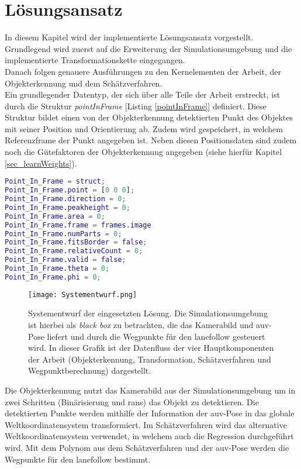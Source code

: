 \cleardoublepage
\section{Lösungsansatz}
In diesem Kapitel wird der implementierte Lösungsansatz vorgestellt. Grundlegend wird zuerst auf die Erweiterung der Simulationsumgebung und die implementierte Transformationskette eingegangen.\\
Danach folgen genauere Ausführungen zu den Kernelementen der Arbeit, der Objekterkennung und dem Schätzverfahren.\\

Ein grundlegender Datentyp, der sich über alle Teile der Arbeit erstreckt, ist durch die Struktur \textit{pointInFrame} [Listing \ref{pointInFrame}] definiert. Diese Struktur bildet einen von der Objekterkennung detektierten Punkt des Objektes mit seiner Position und Orientierung ab. Zudem wird gespeichert, in welchem Referenzframe der Punkt angegeben ist. Neben diesen Positionsdaten sind zudem noch die Gütefaktoren der Objekterkennung angegeben (siehe hierfür Kapitel \ref{sec_learnWeights}).

\begin{lstlisting}[language=Matlab,caption={[Initialisierung der \textit{pointInFrame}-Struktur]Initialisierung der \textit{pointInFrame}-Struktur, die erkannte Punkte in verschiedenen Referenzkoordinatensystemen abbildet.}, label = pointInFrame]
Point_In_Frame = struct;
Point_In_Frame.point = [0 0 0];
Point_In_Frame.direction = 0;
Point_In_Frame.peakheight = 0;
Point_In_Frame.area = 0;
Point_In_Frame.frame = frames.image
Point_In_Frame.numParts = 0;
Point_In_Frame.fitsBorder = false;
Point_In_Frame.relativeCount = 0;
Point_In_Frame.valid = false;
Point_In_Frame.theta = 0;
Point_In_Frame.phi = 0;
\end{lstlisting}

\begin{figure}[H]
\texttt{[image: Systementwurf.png]}
\caption[Systementwurf]{Systementwurf der eingesetzten Lösung. Die Simulationsumgebung ist hierbei als \textit{black box} zu betrachten, die das Kamerabild und \gls{auv}-Pose liefert und durch die Wegpunkte für den \gls{lanefollow} gesteuert wird. In dieser Grafik ist der Datenfluss der vier Hauptkomponenten der Arbeit (Objekterkennung, Transformation, Schätzverfahren und Wegpunktberechnung) dargestellt.}
\end{figure}
Die Objekterkennung nutzt das Kamerabild aus der Simulationsumgebung um in zwei Schritten (Binärisierung und \gls{rans}) das Objekt zu detektieren. Die detektierten Punkte werden mithilfe der Information der \gls{auv}-Pose in das globale Weltkoordinatensystem transformiert. Im Schätzverfahren wird das alternative Weltkoordinatensystem verwendet, in welchem auch die Regression durchgeführt wird. Mit dem Polynom aus dem Schätzverfahren und der \gls{auv}-Pose werden die Wegpunkte für den \gls{lanefollow} bestimmt.


\newpage

\newpage

\newpage
